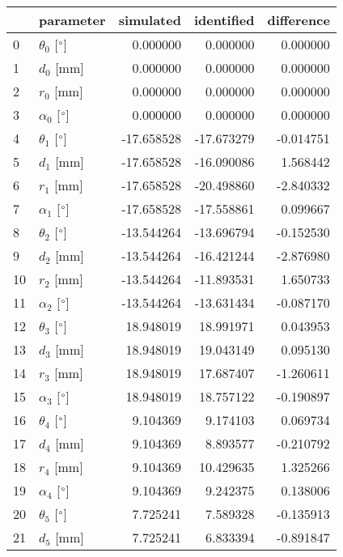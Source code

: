 \documentclass{standalone}%
\begin{document}
%
\normalsize%
\begin{tabular}{llrrr}
\toprule
{} &                 parameter &  simulated & identified & difference \\
\midrule
0  &  $\theta_{0}$ [$\degree$] &   0.000000 &   0.000000 &   0.000000 \\
1  &              $d_{0}$ [mm] &   0.000000 &   0.000000 &   0.000000 \\
2  &              $r_{0}$ [mm] &   0.000000 &   0.000000 &   0.000000 \\
3  &  $\alpha_{0}$ [$\degree$] &   0.000000 &   0.000000 &   0.000000 \\
4  &  $\theta_{1}$ [$\degree$] & -17.658528 & -17.673279 &  -0.014751 \\
5  &              $d_{1}$ [mm] & -17.658528 & -16.090086 &   1.568442 \\
6  &              $r_{1}$ [mm] & -17.658528 & -20.498860 &  -2.840332 \\
7  &  $\alpha_{1}$ [$\degree$] & -17.658528 & -17.558861 &   0.099667 \\
8  &  $\theta_{2}$ [$\degree$] & -13.544264 & -13.696794 &  -0.152530 \\
9  &              $d_{2}$ [mm] & -13.544264 & -16.421244 &  -2.876980 \\
10 &              $r_{2}$ [mm] & -13.544264 & -11.893531 &   1.650733 \\
11 &  $\alpha_{2}$ [$\degree$] & -13.544264 & -13.631434 &  -0.087170 \\
12 &  $\theta_{3}$ [$\degree$] &  18.948019 &  18.991971 &   0.043953 \\
13 &              $d_{3}$ [mm] &  18.948019 &  19.043149 &   0.095130 \\
14 &              $r_{3}$ [mm] &  18.948019 &  17.687407 &  -1.260611 \\
15 &  $\alpha_{3}$ [$\degree$] &  18.948019 &  18.757122 &  -0.190897 \\
16 &  $\theta_{4}$ [$\degree$] &   9.104369 &   9.174103 &   0.069734 \\
17 &              $d_{4}$ [mm] &   9.104369 &   8.893577 &  -0.210792 \\
18 &              $r_{4}$ [mm] &   9.104369 &  10.429635 &   1.325266 \\
19 &  $\alpha_{4}$ [$\degree$] &   9.104369 &   9.242375 &   0.138006 \\
20 &  $\theta_{5}$ [$\degree$] &   7.725241 &   7.589328 &  -0.135913 \\
21 &              $d_{5}$ [mm] &   7.725241 &   6.833394 &  -0.891847 \\

\end{tabular}
\end{document}
